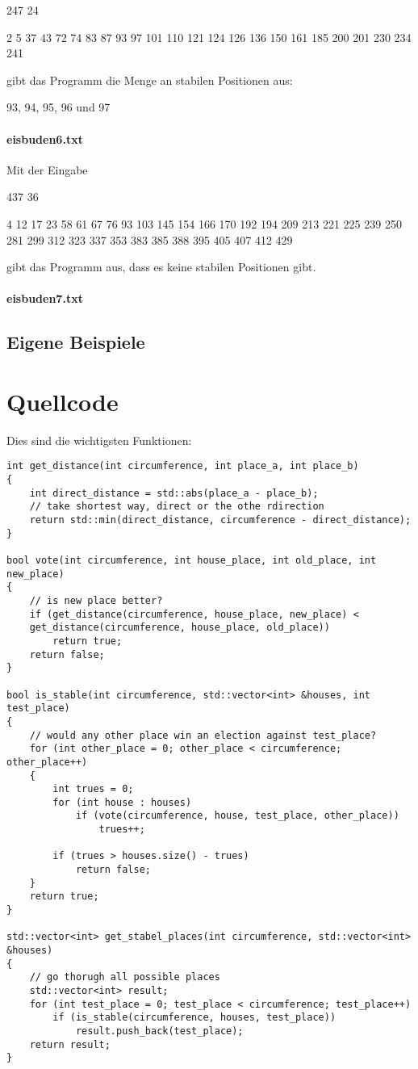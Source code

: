 \documentclass[a4paper,10pt,ngerman]{scrartcl}
\begin{document}
247 24

2 5 37 43 72 74 83 87 93 97 101 110 121 124 126 136 150 161 185 200 201 230 234 241

gibt das Programm die Menge an stabilen Positionen aus:

93, 94, 95, 96 und 97

\paragraph{eisbuden6.txt}
Mit der Eingabe

437 36

4 12 17 23 58 61 67 76 93 103 145 154 166 170 192 194 209 213 221 225 239 250 281 299 312 323 337 353 383 385 388 395 405 407 412 429

gibt das Programm aus, dass es keine stabilen Positionen gibt.

\paragraph{eisbuden7.txt}

\subsection{Eigene Beispiele}



\section{Quellcode}
Dies sind die wichtigsten Funktionen:
\begin{lstlisting}
int get_distance(int circumference, int place_a, int place_b)
{
    int direct_distance = std::abs(place_a - place_b);
    // take shortest way, direct or the othe rdirection
    return std::min(direct_distance, circumference - direct_distance);
}

bool vote(int circumference, int house_place, int old_place, int new_place)
{
    // is new place better?
    if (get_distance(circumference, house_place, new_place) <
    get_distance(circumference, house_place, old_place))
        return true;
    return false;
}

bool is_stable(int circumference, std::vector<int> &houses, int test_place)
{
    // would any other place win an election against test_place?
    for (int other_place = 0; other_place < circumference; other_place++)
    {
        int trues = 0;
        for (int house : houses)
            if (vote(circumference, house, test_place, other_place))
                trues++;

        if (trues > houses.size() - trues)
            return false;
    }
    return true;
}

std::vector<int> get_stabel_places(int circumference, std::vector<int> &houses)
{
    // go thorugh all possible places
    std::vector<int> result;
    for (int test_place = 0; test_place < circumference; test_place++)
        if (is_stable(circumference, houses, test_place))
            result.push_back(test_place);
    return result;
}
\end{lstlisting}
\end{document}
